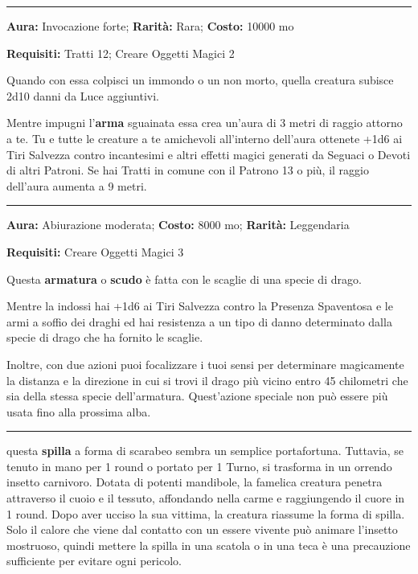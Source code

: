 \begin{multicols}{2}
\smallskip\noindent\rule{\linewidth}{2pt}  \hypertarget{Sacra}{}\smallskip{}\noindent\label{Sacra}

\textbf{Aura:} Invocazione forte; \textbf{Rarità:} Rara; \textbf{Costo:} 10000 mo

\textbf{Requisiti:} Tratti  12; Creare Oggetti Magici 2

Quando con essa colpisci un immondo o un non morto, quella creatura subisce 2d10 danni da Luce aggiuntivi.

Mentre impugni l'\textbf{arma} sguainata essa crea un'aura di 3 metri di raggio attorno a te. Tu e tutte le creature a te amichevoli all'interno dell'aura ottenete +1d6 ai Tiri Salvezza contro incantesimi e altri effetti magici generati da Seguaci o Devoti di altri Patroni. Se hai Tratti in comune con il Patrono 13 o più, il raggio dell'aura aumenta a 9 metri.

\smallskip\noindent\rule{\linewidth}{2pt}  \hypertarget{ScagliediDrago}{}\smallskip{}\noindent\label{ScagliediDrago}

\textbf{Aura:} Abiurazione moderata; \textbf{Costo:} 8000 mo; \textbf{Rarità:} Leggendaria

\textbf{Requisiti:} Creare Oggetti Magici 3

Questa \textbf{armatura} o \textbf{scudo} è fatta con le scaglie di una specie di drago.

Mentre la indossi hai +1d6 ai Tiri Salvezza contro la Presenza Spaventosa e le armi a soffio dei draghi ed hai resistenza a un tipo di danno determinato dalla specie di drago che ha fornito le scaglie.

Inoltre, con due azioni puoi focalizzare i tuoi sensi per determinare magicamente la distanza e la direzione in cui si trovi il drago più vicino entro 45 chilometri che sia della stessa specie dell'armatura. Quest'azione speciale non può essere più usata fino alla prossima alba.

\smallskip\noindent\rule{\linewidth}{2pt}  \hypertarget{ScarabeodellaMorte}{}\smallskip{}\noindent\label{ScarabeodellaMorte}

questa \textbf{spilla} a forma di scarabeo sembra un semplice portafortuna. Tuttavia, se tenuto in mano per 1 round o portato per 1 Turno, si trasforma in un orrendo insetto carnivoro. Dotata di potenti mandibole, la famelica creatura penetra attraverso il cuoio e il tessuto, affondando nella carme e raggiungendo il cuore in 1 round. Dopo aver ucciso la sua vittima, la creatura riassume la forma di spilla. Solo il calore che viene dal contatto con un essere vivente può animare l'insetto mostruoso, quindi mettere la spilla in una scatola o in una teca è una precauzione sufficiente per evitare ogni pericolo.


\end{multicols}
